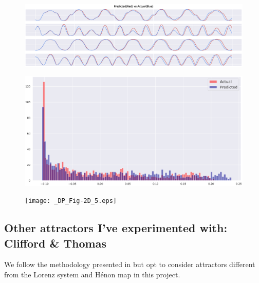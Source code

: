 \documentclass[a4paper,12pt,twoside]{report}
\begin{document}
\begin{figure}[ht]
  \centering
  \includegraphics[width=\linewidth]{_DP_Fig-2F2023.eps} 
\end{figure}
\begin{figure}[ht]
  \centering
  \includegraphics[width=\linewidth]{_DP_Fig-2B2023.eps}
  \end{figure}
  \begin{figure}[ht]
    \centering 
  \texttt{[image: \_DP\_Fig-2D\_5.eps]}
\end{figure}

\subsection{Other attractors I’ve experimented with: Clifford \& Thomas}
We follow the methodology presented in \cite{manjunath2021universal} but opt to consider attractors different from the Lorenz system and H\'enon map in this project.
\end{document}
